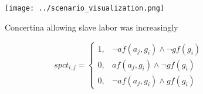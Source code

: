 \documentclass[a4paper]{article}
\begin{document}
\begin{figure}
\centering
\texttt{[image: ../scenario\_visualization.png]}
\caption{Concertina allowing slave labor was increasingly 
}
\end{figure}
 
\begin{equation}
spct_{i,j} =
\begin{cases}
1, & \text{$\neg af(a_j,g_i) \wedge \neg gf(g_i)$}\\
0, & \text{$af(a_j,g_i) \wedge \neg gf(g_i)$}\\
0, & \text{$\neg af(a_j,g_i) \wedge gf(g_i)$}
\end{cases}
\end{equation}
\end{document}
